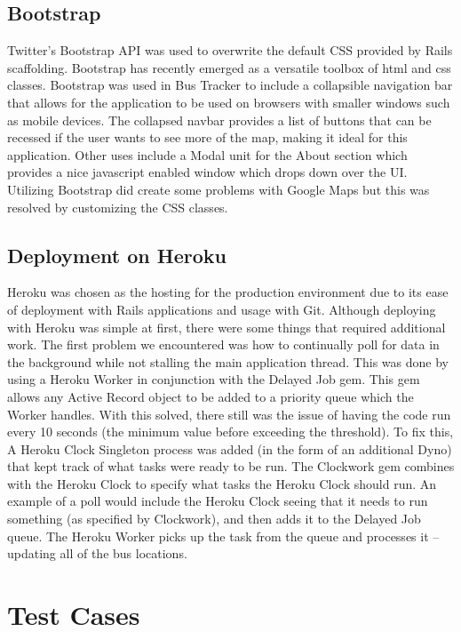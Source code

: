 \documentclass[12pt]{report}
\begin{document}
\section{Bootstrap}

Twitter's Bootstrap API was used to overwrite the default CSS provided by Rails scaffolding.  Bootstrap has recently emerged as a versatile toolbox of html and css classes.  Bootstrap was used in Bus Tracker to include a collapsible navigation bar that allows for the application to be used on browsers with smaller windows such as mobile devices.  The collapsed navbar provides a list of buttons that can be recessed if the user wants to see more of the map, making it ideal for this application.  Other uses include a Modal unit for the About section which provides a nice javascript enabled window which drops down over the UI.  Utilizing Bootstrap did create some problems with Google Maps but this was resolved by customizing the CSS classes.
\cite{bootstrap}
\section{Deployment on Heroku}

Heroku was chosen as the hosting for the production environment due to its ease of deployment with Rails applications and usage with Git.  Although deploying with Heroku was simple at first, there were some things that required additional work.  The first problem we encountered was how to continually poll for data in the background while not stalling the main application thread.  This was done by using a Heroku Worker in conjunction with the Delayed Job gem.  This gem allows any Active Record object to be added to a priority queue which the Worker handles.  With this solved, there still was the issue of having the code run every 10 seconds (the minimum value before exceeding the threshold).  To fix this, A Heroku Clock Singleton process was added (in the form of an additional Dyno) that kept track of what tasks were ready to be run.  The Clockwork gem combines with the Heroku Clock to specify what tasks the Heroku Clock should run.  An example of a poll would include the Heroku Clock seeing that it needs to run something (as specified by Clockwork), and then adds it to the Delayed Job queue. The Heroku Worker picks up the task from the queue and processes it -- updating all of the bus locations. \cite{heroku}


\chapter{Test Cases}
\end{document}
